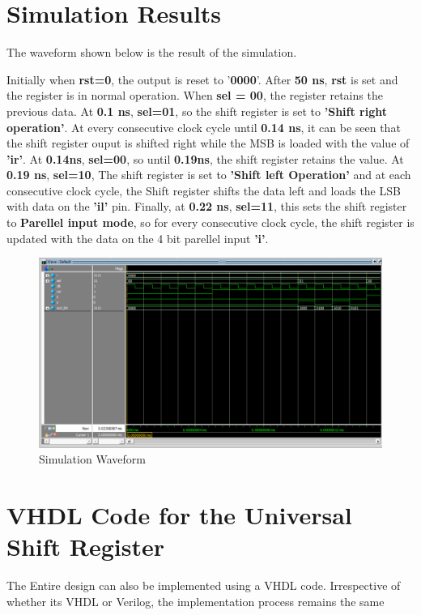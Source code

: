 \documentclass[12pt]{article}
\begin{document}
\section{Simulation Results}
The waveform shown below is the result of the simulation.

\noindent Initially when \textbf{rst=0}, the output is reset to '\textbf{0000}'. After \textbf{50 ns}, \textbf{rst} is set and the register is in normal operation. When \textbf{sel = 00}, the register retains the previous data. At \textbf{0.1 ns}, \textbf{sel=01}, so the shift register is set to \textbf{'Shift right operation'}. At every consecutive clock cycle until \textbf{0.14 ns}, it can be seen that the shift register ouput is shifted right while the MSB is loaded with the value of \textbf{'ir'}. At \textbf{0.14ns}, \textbf{sel=00}, so until \textbf{0.19ns}, the shift register retains the value. At \textbf{0.19 ns}, \textbf{sel=10}, The shift register is set to \textbf{'Shift left Operation'} and at each consecutive clock cycle, the Shift register shifts the data left and loads the LSB with data on the \textbf{'il'} pin. Finally, at \textbf{0.22 ns}, \textbf{sel=11}, this sets the shift register to \textbf{Parellel input mode}, so for every consecutive clock cycle, the shift register is updated with the data on the 4 bit parellel input \textbf{'i'}.
\begin{figure}[H]
    \centering
    \includegraphics[scale = 0.4]{usrsimu.png}
    \caption{Simulation Waveform}
\end{figure}

\newpage
\section{VHDL Code for the Universal Shift Register}
The Entire design can also be implemented using a VHDL code. Irrespective of whether its VHDL or Verilog, the implementation process remains the same
\end{document}
